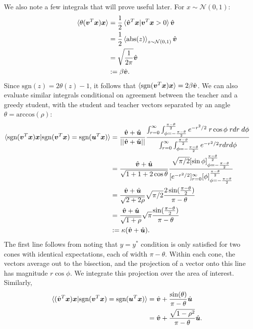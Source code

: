 \documentclass{article}
\renewcommand\b\bm
\begin{document}
We also note a few integrals that will prove useful later.
For $x \sim \mathcal{N}(0, 1)$:
\begin{align}
    \braket{\theta (\b{v}^T \b{x}) \b{x} } &= \frac{1}{2} \braket{ \hat{\b{v}}^T \b{x} | \b{v}^T \b{x} > 0 } \hat{\b{v}}\\
    &= \frac{1}{2} \braket{\text{abs}(z)}_{z \sim \mathcal{N}(0, 1)} \hat{\b{v}}\\
    &= \sqrt{\frac{1}{2 \pi}} \hat{\b{v}}\\
    &:= \beta \hat{\b{v}}.
\end{align}
Since $\text{sgn}(z) = 2 \theta(z) - 1$, it follows that $\braket{\text{sgn} (\b{v}^T \b{x}) \b{x} } = 2 \beta \tilde{\b{v}}$.
We can also evaluate similar integrals conditional on agreement between the teacher and a greedy student, with the student and teacher vectors separated by an angle $\theta = \text{arccos}(\rho)$:
\begin{align}
    \label{eq:conditonal_sgn}
    \braket{\text{sgn}(\b{v}^T \b{x}) \b{x} | \text{sgn}(\b{v}^T \b{x})= \text{sgn}(\b{u}^T \b{x})} &= \frac{\hat{\b{v}} + \hat{\b{u}}}{|| \hat{\b{v}} + \hat{\b{u}} || } \frac{\int_{r = 0}^{\infty} \int_{\phi = - \frac{\pi - \theta}{2}}^{\frac{\pi - \theta}{2}} e^{-r^2/2} \; r \cos \phi  \; r dr \; d \phi}{\int_{r = 0}^{\infty} \int_{\phi = - \frac{\pi - \theta}{2}}^{\frac{\pi - \theta}{2}} e^{-r^2/2} r dr d \phi} \\ 
    &= \frac{\hat{\b{v}} + \hat{\b{u}}}{ \sqrt{ 1 + 1 + 2 \cos \theta } } \frac{\sqrt{\pi / 2} [\sin \phi]_{\phi = - \frac{\pi - \theta}{2}}^{\frac{\pi - \theta}{2}} }{ [e^{-r^2/2}]_{r=0}^\infty [\phi]_{\phi = - \frac{\pi - \theta}{2}}^{\frac{\pi - \theta}{2}} }\\
    &= \frac{\hat{\b{v}} + \hat{\b{u}}}{ \sqrt{2 + 2 \rho} } \sqrt{\pi / 2} \frac{2 \sin (\frac{\pi - \theta}{2}) }{\pi - \theta}\\
    &= \frac{\hat{\b{v}} + \hat{\b{u}}}{ \sqrt{ 1 + \rho} } \sqrt{ \pi} \frac{\sin (\frac{\pi - \theta}{2}) }{\pi - \theta}\\
    &:= \kappa ( \hat{\b{v}} + \hat{\b{u}} ).
\end{align}
The first line follows from noting that $y = y^*$ condition is only satisfied for two cones with identical expectations, each of width $\pi - \theta$.
Within each cone, the vectors average out to the bisection, and the projection of a vector onto this line has magnitude $r \cos \phi$.
We integrate this projection over the area of interest.
Similarly,
\begin{align}
    \label{eq:conditonal_lin}
    \braket{(\hat{\b{v}}^T \b{x}) \b{x} | \text{sgn}(\b{v}^T \b{x})= \text{sgn}(\b{u}^T \b{x})} &= \hat{\b{v}} + \frac{\sin (\theta) }{\pi - \theta} \hat{\b{u}}\\
    &= \hat{\b{v}} + \frac{ \sqrt{1-\rho^2} }{\pi - \theta} \hat{\b{u}}.
\end{align}
\end{document}
